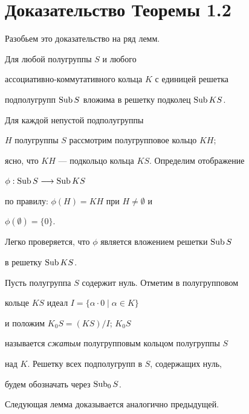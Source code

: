 \section{Доказательство Теоремы 1.2}





Разобьем это доказательство на ряд лемм.





\begin{lemm} Для любой полугруппы $S$ и любого


ассоциативно-коммутативного кольца $K$ с единицей решетка


подполугрупп $\operatorname{Sub} S$ вложима в решетку подколец $\operatorname{Sub} KS$.


\end{lemm}





\begin{pf} Для каждой непустой подполугруппы


$H$ полугруппы $S$ рассмотрим полугрупповое кольцо $KH$;


ясно, что $KH$ --- подкольцо кольца $KS$. Определим отображение


$\phi: \operatorname{Sub} S \longrightarrow \operatorname{Sub} KS$


по правилу: $\phi(H) = KH$ при $H \ne \emptyset$ и


$\phi(\emptyset) = \{0\}$.


Легко проверяется, что $\phi$ является вложением решетки $\operatorname{Sub} S$


в решетку $\operatorname{Sub} KS$.


\end{pf}





Пусть полугруппа $S$ содержит нуль. Отметим в полугрупповом


кольце $KS$ идеал $I = \{\alpha \cdot 0 \mid \alpha \in K \}$


и положим $K_{0}S = (KS)/I$; $K_{0}S$


называется {\em сжатым} полугрупповым кольцом полугруппы $S$


над $K$. Решетку всех подполугрупп в $S$, содержащих нуль,


будем обозначать через $\operatorname{Sub}_0 S$.





Следующая лемма доказывается аналогично предыдущей.





